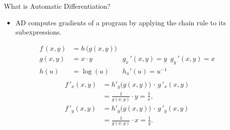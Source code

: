 \documentclass[dvipsnames]{beamer}
\begin{document}
\begin{frame}[fragile]{What is Automatic Differentiation?}
\begin{itemize}
  \item AD computes gradients of a program by applying the chain rule to its subexpressions.
\end{itemize}
\begin{align*}
f\,(x,y) &= h\,\!\big(g(x,y)\big) \\
g(x, y) &= x \cdot y \;& g_x\,'(x,y) = y \:\; g_y\,'(x,y) = x\\[2pt]
h(u) &= \log(u) \;& h_u'(u) = u^{-1}\\
\end{align*}
\vspace{-1cm}
\begin{align*}
f\,'_x(x,y)
  &= h'_g\!\big(g(x,y)\big)\,\cdot\, g\,'_x(x,y) \\
  &= \frac{1}{g(x, y)} \cdot y = \frac{1}{x}, \\[6pt]
f\,'_y(x,y)
  &= h'_g\!\big(g(x,y)\big)\,\cdot\, g\,'_y(x,y) \\
  &= \frac{1}{g(x, y)} \cdot x = \frac{1}{y}.
\end{align*}
\end{frame}
\end{document}
